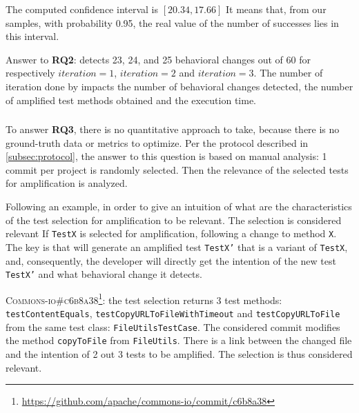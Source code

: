 The computed confidence interval is $\left[20.34, 17.66\right]$
It means that, from our samples, with probability 0.95, the real value of the number of successes lies in this interval.

\begin{mdframed}
Answer to \textbf{RQ2}: \DCII detects  23, 24, and 25 behavioral changes out of 60 for respectively $iteration=1$, $iteration=2$ and $iteration=3$.
The number of iteration done by \DCII impacts the number of behavioral changes detected, the number of amplified test methods obtained and the execution time.
\end{mdframed}


\subsubsection{\rqselection}
\label{subsubsec:dci:evaluation:rq3}

To answer \textbf{RQ3}, there is no quantitative approach to take, because there is no ground-truth data or metrics to optimize. 
Per the protocol described in \autoref{subsec:protocol}, the answer to this question is based on manual analysis:
1 commit per project is randomly selected.
Then the relevance of the selected tests for amplification is analyzed.

Following an example, in order to give an intuition of what are the characteristics of the test selection for amplification to be relevant.
The selection is considered relevant If \texttt{TestX} is selected for amplification, following a change to method \texttt{X}.
The key is that \DCI will generate an amplified test \texttt{TestX'} that is a variant of \texttt{TestX}, and, consequently, the developer will directly get the intention of the new test \texttt{TestX'} and what behavioral change it detects.

\textsc{Commons-io\#c6b8a38}\footnote{\url{https://github.com/apache/commons-io/commit/c6b8a38}}: the test selection returns 3 test methods: \texttt{testContentEquals}, \texttt{testCopyURLToFileWithTimeout} and \texttt{testCopyURLToFile} from the same test class: \texttt{FileUtilsTestCase}.
The considered commit modifies the method \texttt{copyToFile} from \texttt{FileUtils}.
There is a link between the changed file and the intention of 2 out 3 tests to be amplified.
The selection is thus considered relevant.

